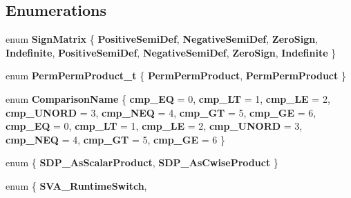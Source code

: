 \subsection*{Enumerations}
\begin{DoxyCompactItemize}
\item 
\mbox{\label{namespace_eigen_1_1internal_a39fc8ba8ec6e221fec1919403dac3b1b}} 
enum {\bfseries Sign\+Matrix} \{ \newline
{\bfseries Positive\+Semi\+Def}, 
{\bfseries Negative\+Semi\+Def}, 
{\bfseries Zero\+Sign}, 
{\bfseries Indefinite}, 
\newline
{\bfseries Positive\+Semi\+Def}, 
{\bfseries Negative\+Semi\+Def}, 
{\bfseries Zero\+Sign}, 
{\bfseries Indefinite}
 \}
\item 
\mbox{\label{namespace_eigen_1_1internal_a837e6488b526acf05536e7ebf64245b4}} 
enum {\bfseries Perm\+Perm\+Product\+\_\+t} \{ {\bfseries Perm\+Perm\+Product}, 
{\bfseries Perm\+Perm\+Product}
 \}
\item 
\mbox{\label{namespace_eigen_1_1internal_a11df3bc16c766c83507d4d59b6ef56e2}} 
enum {\bfseries Comparison\+Name} \{ \newline
{\bfseries cmp\+\_\+\+EQ} = 0, 
{\bfseries cmp\+\_\+\+LT} = 1, 
{\bfseries cmp\+\_\+\+LE} = 2, 
{\bfseries cmp\+\_\+\+U\+N\+O\+RD} = 3, 
\newline
{\bfseries cmp\+\_\+\+N\+EQ} = 4, 
{\bfseries cmp\+\_\+\+GT} = 5, 
{\bfseries cmp\+\_\+\+GE} = 6, 
{\bfseries cmp\+\_\+\+EQ} = 0, 
\newline
{\bfseries cmp\+\_\+\+LT} = 1, 
{\bfseries cmp\+\_\+\+LE} = 2, 
{\bfseries cmp\+\_\+\+U\+N\+O\+RD} = 3, 
{\bfseries cmp\+\_\+\+N\+EQ} = 4, 
\newline
{\bfseries cmp\+\_\+\+GT} = 5, 
{\bfseries cmp\+\_\+\+GE} = 6
 \}
\item 
\mbox{\label{namespace_eigen_1_1internal_aa762519186c4224db8b0641917b49b65}} 
enum \{ {\bfseries S\+D\+P\+\_\+\+As\+Scalar\+Product}, 
{\bfseries S\+D\+P\+\_\+\+As\+Cwise\+Product}
 \}
\item 
\mbox{\label{namespace_eigen_1_1internal_aca5c625557b205a16359eee0e7986753}} 
enum \{ {\bfseries S\+V\+A\+\_\+\+Runtime\+Switch}, 

\end{DoxyCompactItemize}
